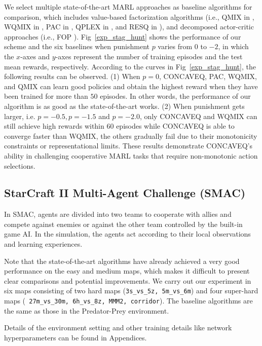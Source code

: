We select multiple state-of-the-art MARL approaches as baseline algorithms for comparison, which includes value-based factorization algorithms (i.e., QMIX in \cite{QMIX}, WQMIX in \cite{WQMIX}, PAC in \cite{pac},  QPLEX in \cite{QPLEX}, and RESQ in \cite{ResQ}), and decomposed actor-critic approaches (i.e., FOP \cite{fop} ).  
Fig~\ref{exp_stag_hunt} shows the performance of our scheme and the six baselines when punishment $p$ varies from $0$ to $-2$, in which the $x$-axes and $y$-axes represent the number of training episodes and the test mean rewards, respectively. According to the curves in Fig~\ref{exp_stag_hunt}, the following results can be observed. (1) When $p=0$,  CONCAVEQ, PAC, WQMIX, and QMIX can learn good policies and obtain the highest reward when they have been trained for more than $50$ episodes. In other words, the performance of our algorithm is as good as the state-of-the-art works. (2) When punishment gets larger, i.e. $p=-0.5, p= -1.5$ and $p=-2.0$, only CONCAVEQ and WQMIX can still achieve high rewards within $60$ episodes while CONCAVEQ is able to converge faster than WQMIX, the others gradually fail due to their monotonicity constraints or representational limits. These results demonstrate CONCAVEQ's ability in challenging cooperative MARL tasks that require non-monotonic action selections.





\subsection{StarCraft II Multi-Agent Challenge (SMAC)}
In SMAC, agents are divided into two teams to cooperate with allies and compete against enemies or against the other team controlled by the built-in game AI. In the simulation, the agents act according to their local observations and learning experiences.


Note that the state-of-the-art algorithms have already achieved a very good performance on the easy and medium maps, which makes it difficult to present clear comparisons and potential improvements. We carry out our experiment in six maps consisting of two hard maps (\texttt{3s\_vs\_5z, 5m\_vs\_6m}) and four super-hard maps (\texttt{ 27m\_vs\_30m, 6h\_vs\_8z, MMM2, corridor}). The baseline algorithms are the same as those in the Predator-Prey environment. 


Details of the environment setting and other training details like network hyperparameters can be found in Appendices.

